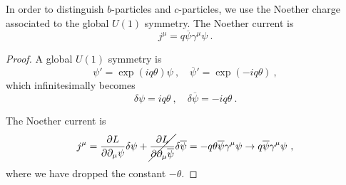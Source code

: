     In order to distinguish $b$-particles and $c$-particles, we use the Noether charge associated to the global $U(1)$ symmetry. The Noether current is 
    \begin{equation*}
        j^\mu = q \overline \psi \gamma^\mu \psi ~.
    \end{equation*}
    \begin{proof}
        A global $U(1)$ symmetry is 
        \begin{equation*}
            \psi' = \exp(i q \theta) \psi ~, \quad \overline \psi' = \exp(- i q \theta) ~,
        \end{equation*}
        which infinitesimally becomes
        \begin{equation*}
            \delta \psi = i q \theta ~, \quad \delta \overline \psi = - i q \theta ~.
        \end{equation*}

        The Noether current is 
        \begin{equation*}
            j^\mu = \frac{\partial L}{\partial\partial_\mu \psi} \delta \psi + \cancel{\frac{\partial L}{\partial\partial_\mu \overline \psi}} \delta \overline \psi = - q \theta \overline \psi \gamma^\mu \psi \rightarrow q \overline \psi \gamma^\mu \psi ~,
        \end{equation*}
        where we have dropped the constant $- \theta$.
    \end{proof}

